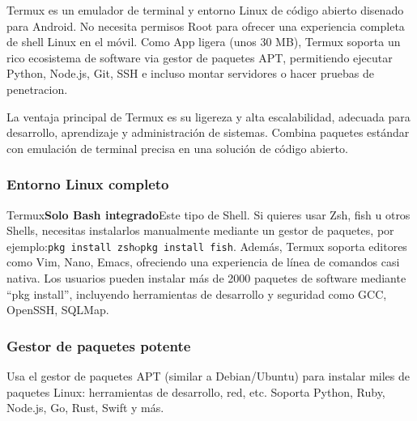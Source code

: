 


Termux es un emulador de terminal y entorno Linux de código abierto disenado para Android. No necesita permisos Root para ofrecer una experiencia completa de shell Linux en el móvil. Como App ligera (unos 30 MB), Termux soporta un rico ecosistema de software via gestor de paquetes APT, permitiendo ejecutar Python, Node.js, Git, SSH e incluso montar servidores o hacer pruebas de penetracion.

La ventaja principal de Termux es su ligereza y alta escalabilidad, adecuada para desarrollo, aprendizaje y administración de sistemas. Combina paquetes estándar con emulación de terminal precisa en una solución de código abierto.


\subsubsection*{Entorno Linux completo}

Termux\textbf{Solo Bash integrado}Este tipo de Shell. Si quieres usar Zsh, fish u otros Shells, necesitas instalarlos manualmente mediante un gestor de paquetes, por ejemplo:\texttt{pkg install zsh}o\texttt{pkg install fish}. Además, Termux soporta editores como Vim, Nano, Emacs, ofreciendo una experiencia de línea de comandos casi nativa. Los usuarios pueden instalar más de 2000 paquetes de software mediante “pkg install”, incluyendo herramientas de desarrollo y seguridad como GCC, OpenSSH, SQLMap.

\subsubsection*{Gestor de paquetes potente}

Usa el gestor de paquetes APT (similar a Debian/Ubuntu) para instalar miles de paquetes Linux: herramientas de desarrollo, red, etc. Soporta Python, Ruby, Node.js, Go, Rust, Swift y más.

